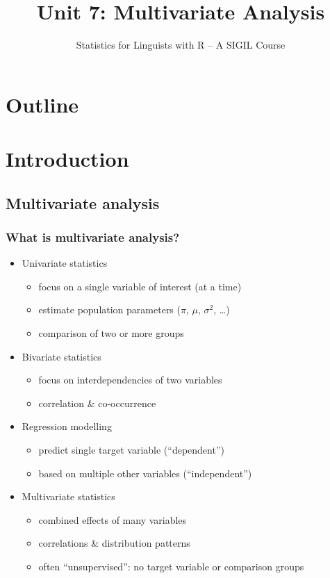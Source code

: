 \documentclass[t]{beamer} %
\title[7.\ Multivariate Analysis]{Unit 7: Multivariate Analysis}
\subtitle{Statistics for Linguists with R -- A SIGIL Course}
\date[sigil.r-forge.r-project.org]{%
  \light{\tiny \sigilcopyright}}
\begin{document}
\frame{\titlepage}


\section*{Outline}

\section{Introduction}

\subsection{Multivariate analysis}

\begin{frame}
  \frametitle{What is multivariate analysis?}

  \begin{itemize}
  \item Univariate statistics
    \begin{itemize}
    \item focus on a single variable of interest (at a time)
    \item estimate population parameters ($\pi$, $\mu$, $\sigma^2$, \ldots)
    \item comparison of two or more groups
    \end{itemize}
  \item<2-> Bivariate statistics
    \begin{itemize}
    \item focus on interdependencies of two variables
    \item correlation \& co-occurrence
    \end{itemize}
  \item<3-> Regression modelling
    \begin{itemize}
    \item predict single target variable (``dependent'')
    \item based on multiple other variables (``independent'')
    \end{itemize}
  \item<4-> Multivariate statistics
    \begin{itemize}
    \item combined effects of many variables
    \item correlations \& distribution patterns
    \item often ``unsupervised'': no target variable or comparison groups
    \end{itemize}
  \end{itemize}
\end{frame}
\end{document}
